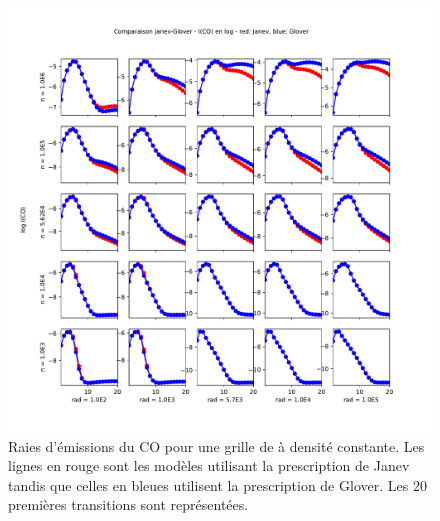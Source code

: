 \begin{figure}[!h]
    \centering
    \includegraphics[trim = {0 0 0 3cm },clip,width=1\textwidth]{figure/H2/bosse_dcte_janevVSglover/PlotComp_Janev_Glover_IntCO.pdf}
    \caption{Raies d'émissions du $\mathrm{CO}$ pour une grille de à densité constante. Les lignes en rouge sont les modèles utilisant la prescription de Janev tandis que celles en bleues utilisent la prescription de Glover. Les $20$ premières transitions sont représentées.}
    \label{fig:H2:bosse:IgridCO}
\end{figure}





